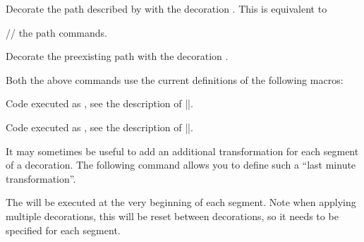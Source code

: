 \begin{command}{\pgfdecoratepath{}}
    Decorate the path described by  with the decoration
    . This is equivalent to
\begin{codeexample}
  // the path commands.
\endpgfdecorate
\end{codeexample}
\end{command}

\begin{command}{\pgfdecoratecurrentpath{}}
    Decorate the preexisting path with the decoration .
\end{command}

Both the above commands use the current definitions of the following macros:

\begin{command}{\pgfdecoratebeforecode}
    Code executed as , see the description of |\pgfdecorate|.
\end{command}

\begin{command}{\pgfdecorateaftercode}
    Code executed as , see the description of |\pgfdecorate|.
\end{command}

It may sometimes be useful to add an additional transformation for each segment
of a decoration. The following command allows you to define such a ``last
minute transformation''.

\begin{command}{\pgfsetdecorationsegmenttransformation{}}
    The  will be executed at the very beginning of each segment.
    Note when applying multiple decorations, this will be reset between
    decorations, so it needs to be specified for each segment.
\begin{codeexample}[]
\end{codeexample}
\end{command}


